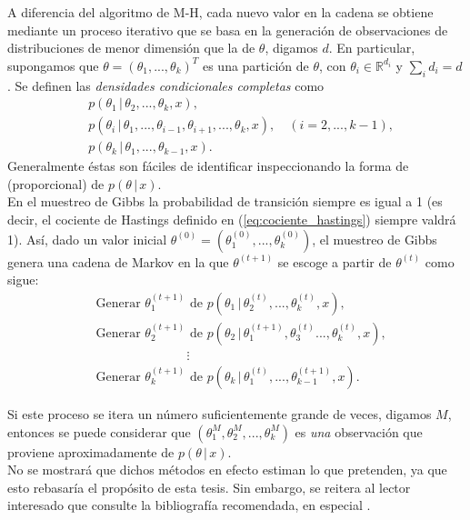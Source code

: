 A diferencia del algoritmo de M-H, cada nuevo valor en la cadena se obtiene mediante un proceso iterativo que se basa en la generación de observaciones de distribuciones de menor dimensión que la de $\theta$, digamos $d$. En particular, supongamos que $\theta = (\theta_1, ..., \theta_k)^T$ es una partición de $\theta$, con $\theta_i \in \mathbb{R}^{d_i}$ y $\sum_i d_i = d$. Se definen las \textit{densidades condicionales completas} como
\begin{align*}
	&p( \theta_1 \, | \, \theta_2, ..., \theta_k, x ), \\
    &p( \theta_i \, | \, \theta_1, ..., \theta_{i-1}, \theta_{i+1}, ..., \theta_k, x ), \quad (i=2, ..., k-1), \\
    &p( \theta_k \, | \, \theta_1, ..., \theta_{k-1}, x ).
\end{align*}
Generalmente éstas son fáciles de identificar inspeccionando la forma de (proporcional) de $p(\theta \, | \, x)$. \\

En el muestreo de Gibbs la probabilidad de transición siempre es igual a 1 (es decir, el cociente de Hastings definido en (\ref{eq:cociente_hastings}) siempre valdrá 1). Así, dado un valor inicial $\theta^{(0)} = (\theta_1^{(0)}, ..., \theta_k^{(0)})$, el muestreo de Gibbs genera una cadena de Markov en la que $\theta^{(t+1)}$  se escoge a partir de $\theta^{(t)}$ como sigue:
\begin{align*}
 &\text{Generar } \theta_1^{(t+1)} \text{ de } p( \theta_1 \, | \, \theta_2^{(t)}, ..., \theta_k^{(t)}, x ), \\
 &\text{Generar } \theta_2^{(t+1)} \text{ de } p( \theta_2 \, | \,
\theta_1^{(t+1)}, \theta_3^{(t)} ..., \theta_k^{(t)}, x ), \\
 &\hspace{3cm}\vdots \\
 &\text{Generar } \theta_k^{(t+1)} \text{ de } p( \theta_k \, | \, \theta_1^{(t)}, ..., \theta_{k-1}^{(t+1)}, x ).
\end{align*} 

Si este proceso se itera un número suficientemente grande de veces, digamos $M$, entonces se puede considerar que $(\theta_{1}^{M}, \theta_{2}^{M}, ..., \theta_{k}^{M})$ es \textit{una} observación que proviene aproximadamente de $p(\theta \, | \, x)$. \\


No se mostrará que dichos métodos en efecto estiman lo que pretenden, ya que esto rebasaría el propósito de esta tesis. Sin embargo, se reitera al lector interesado que consulte la bibliografía recomendada, en especial \citet{chib_mh_history, notas_mcmc_egp, hitchcock_mh_history}.

